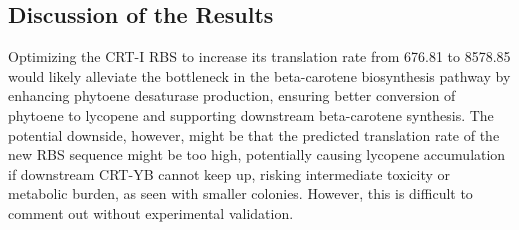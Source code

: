 \documentclass[12pt,a4paper]{article}
\begin{document}
\subsection{Discussion of the Results}
Optimizing the CRT-I RBS to increase its translation rate from 676.81 to
8578.85 would likely alleviate the bottleneck in the beta-carotene biosynthesis
pathway by enhancing phytoene desaturase production, ensuring better conversion
of phytoene to lycopene and supporting downstream beta-carotene synthesis. The
potential downside, however, might be that the predicted translation rate of
the new RBS sequence might be too high, potentially causing lycopene
accumulation if downstream CRT-YB cannot keep up, risking intermediate toxicity
or metabolic burden, as seen with smaller colonies. However, this is difficult
to comment out without experimental validation.



\end{document}
